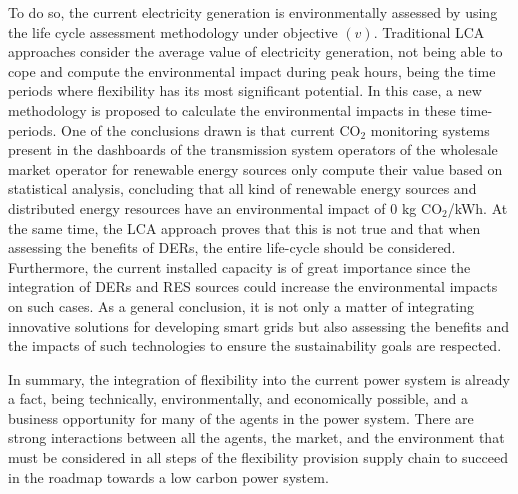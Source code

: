 To do so, the current electricity generation is environmentally assessed by using the life cycle assessment methodology under objective $(v)$. Traditional LCA approaches consider the average value of electricity generation, not being able to cope and compute the environmental impact during peak hours, being the time periods where flexibility has its most significant potential. In this case, a new methodology is proposed to calculate the environmental impacts in these time-periods. One of the conclusions drawn is that current CO$_2$ monitoring systems present in the dashboards of the transmission system operators of the wholesale market operator for renewable energy sources only compute their value based on statistical analysis, concluding that all kind of renewable energy sources and distributed energy resources have an environmental impact of 0 kg CO$_2$/kWh. At the same time, the LCA approach proves that this is not true and that when assessing the benefits of DERs, the entire life-cycle should be considered. Furthermore, the current installed capacity is of great importance since the integration of DERs and RES sources could increase the environmental impacts on such cases. As a general conclusion, it is not only a matter of integrating innovative solutions for developing smart grids but also assessing the benefits and the impacts of such technologies to ensure the sustainability goals are respected. 

In summary, the integration of flexibility into the current power system is already a fact, being technically, environmentally, and economically possible, and a business opportunity for many of the agents in the power system. There are strong interactions between all the agents, the market, and the environment that must be considered in all steps of the flexibility provision supply chain to succeed in the roadmap towards a low carbon power system. 
     
